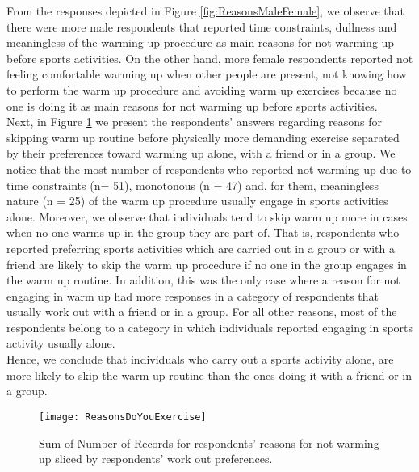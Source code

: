 From the responses depicted in Figure \ref{fig:ReasonsMaleFemale}, we observe that there were more male respondents that reported time constraints, dullness and meaningless of the warming up procedure as main reasons for not warming up before sports activities. On the other hand, more female respondents reported not feeling comfortable warming up when other people are present, not knowing how to perform the warm up procedure and avoiding warm up exercises because no one is doing it as main reasons for not warming up before sports activities. \\Next, in Figure  \ref{fig:ReasonsDoYouExercise} we present the respondents' answers regarding reasons for skipping warm up routine before physically more demanding exercise separated by their preferences toward warming up alone, with a friend or in a group. We notice that the most number of respondents who reported not warming up due to time constraints (n= 51), monotonous (n = 47) and, for them, meaningless nature (n = 25) of the warm up procedure usually engage in sports activities alone. Moreover, we observe that individuals tend to skip warm up more in cases when no one warms up in the group they are part of. That is, respondents who reported preferring sports activities which are carried out in a group or with a friend are likely to skip the warm up procedure if no one in the group engages in the warm up routine. In addition, this was the only case where a reason for not engaging in warm up had more responses in a category of respondents that usually work out with a friend or in a group. For all other reasons, most of the respondents belong to a category in which individuals reported engaging in sports activity usually alone. \\Hence, we conclude that individuals who carry out a sports activity alone, are more likely to skip the warm up routine than the ones doing it with a friend or in a group.\\
\begin{figure}[h]
    \centering
    \texttt{[image: ReasonsDoYouExercise]}
    \caption{Sum of Number of Records for respondents' reasons for not warming up sliced by respondents' work out preferences.}
    \label{fig:ReasonsDoYouExercise}
\end{figure}\\

